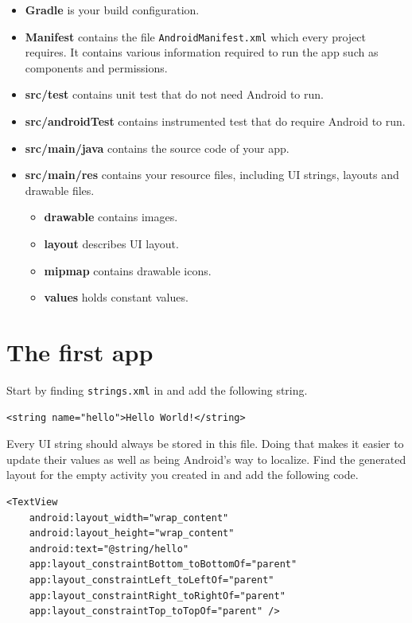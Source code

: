 \begin{itemize}
\item \textbf{Gradle} is your build configuration.
\item \textbf{Manifest} contains the file \verb!AndroidManifest.xml! which every project requires. It contains various information required to run the app such as components and permissions.
\item \textbf{src/test} contains unit test that do not need Android to run.
\item \textbf{src/androidTest} contains instrumented test that do require Android to run.
\item \textbf{src/main/java} contains the source code of your app.
\item \textbf{src/main/res} contains your resource files, including UI strings, layouts and drawable files. 
  \begin{itemize}
      \item \textbf{drawable} contains images.
      \item \textbf{layout} describes UI layout.
      \item \textbf{mipmap} contains drawable icons.
      \item \textbf{values} holds constant values.
  \end{itemize}
\end{itemize}

\section{The first app}
Start by finding \verb!strings.xml! in  and add the following string.
\begin{lstlisting}[style=A_XML]
<string name="hello">Hello World!</string>
\end{lstlisting}
Every UI string should always be stored in this file. Doing that makes it easier to update their values as well as being Android's way to localize. Find the generated layout for the empty activity you created in  and add the following code.
\begin{lstlisting}[style=A_XML]
<TextView
    android:layout_width="wrap_content"
    android:layout_height="wrap_content"
    android:text="@string/hello"
    app:layout_constraintBottom_toBottomOf="parent"
    app:layout_constraintLeft_toLeftOf="parent"
    app:layout_constraintRight_toRightOf="parent"
    app:layout_constraintTop_toTopOf="parent" />
\end{lstlisting}

